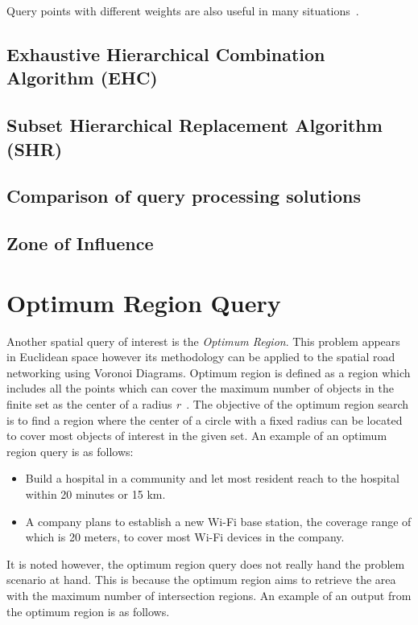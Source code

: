 \documentclass[a4paper,11pt]{article}
\begin{document}
Query points with different weights are also useful in many situations~\cite{deng2012group}.

\subsection{Exhaustive Hierarchical Combination Algorithm (EHC)}

\subsection{Subset Hierarchical Replacement Algorithm (SHR)}

\subsection{Comparison of query processing solutions}

\subsection{Zone of Influence}
 

\section{Optimum Region Query} 

Another spatial query of interest is the \textit{Optimum Region}. This problem appears in Euclidean space however its methodology can be applied to the spatial road networking using Voronoi Diagrams. Optimum region is defined as a region which includes all the points which can cover the maximum number of objects in the finite set as the center of a radius \textit{r}~\cite{Xuan2012}. The objective of the optimum region search is to find a region where the center of a circle with a fixed radius can be located to cover most objects of interest in the given set. An example of an optimum region query is as follows:

\begin{itemize}      
  \item Build a hospital in a community and let most
resident reach to the hospital within 20 minutes or 15 km.      
  \item A company plans to establish a new Wi-Fi base station, the coverage range of
which is 20 meters, to cover most Wi-Fi   devices in the company.
\end{itemize}

It is noted however, the optimum region query does not really hand the problem scenario at hand. This is because the optimum region aims to retrieve the area with the maximum number of intersection regions. An example of an output from the optimum region is as follows.
\end{document}
